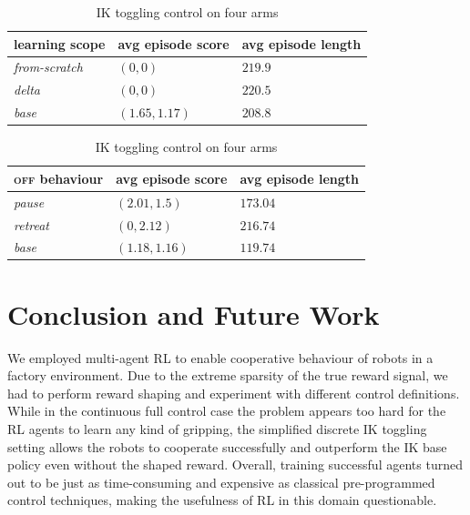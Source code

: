 \documentclass[conference,a4paper]{IEEEtran}
\begin{document}
\begin{table}
\caption{Test results averaged over 100 episodes}
\begin{subtable}{\linewidth}
	\centering
	\caption{Full joint control on two arms}
	\begin{tabular}{lll}\toprule
	learning scope & avg episode score & avg episode length \\\midrule
	\itshape from-scratch & $(0, 0)$ & $\mathbf{219.9}$ \\\midrule
	\itshape delta & $(0,0)$ & $\mathbf{220.5}$ \\\midrule
	\itshape base & $\mathbf{(1.65, 1.17)}$ & $208.8$ \\\bottomrule
	\end{tabular}
	\label{tab:results-continuous}
\end{subtable}
\vspace{5mm}

\begin{subtable}{\linewidth}
	\centering
	\caption{IK toggling control on four arms}
	\begin{tabular}{lll}\toprule
		\textsc{off} behaviour & avg episode score & avg episode length \\\midrule
		\itshape pause & $\mathbf{(2.01, 1.5)}$ & $173.04$ \\\midrule
		\itshape retreat & $(0, 2.12)$ & $\mathbf{216.74}$ \\\midrule
		\itshape base & $(1.18, 1.16)$ & $119.74$ \\\bottomrule
	\end{tabular}
	\label{tab:results-discrete}
\end{subtable}
\end{table}
\vspace{5mm}


\section{Conclusion and Future Work}
\label{sec:conclusion}

We employed multi-agent RL to enable cooperative behaviour of robots in a factory environment. Due to the extreme sparsity of the true reward signal, we had to perform reward shaping and experiment with different control definitions. While in the continuous full control case the problem appears too hard for the RL agents to learn any kind of gripping, the simplified discrete IK toggling setting allows the robots to cooperate successfully and outperform the IK base policy even without the shaped reward. Overall, training successful agents turned out to be just as time-consuming and expensive as classical pre-programmed control techniques, making the usefulness of RL in this domain questionable.
\end{document}
